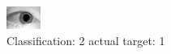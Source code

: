 \begin{figure}[h!]
\begin{center}
\includegraphics[width=0.60\columnwidth]{figures/ID1428_class_2_target_1.png}
\end{center}
\caption{ Classification: 2 actual target: 1}
\label{fig:ID1428_class_2_target_1}
\end{figure}
